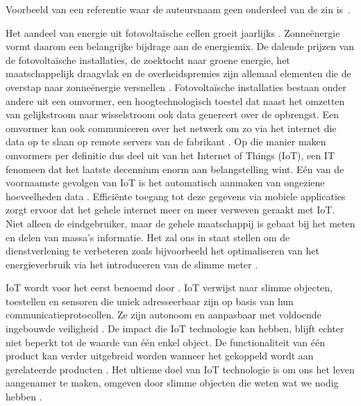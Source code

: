 \documentclass{hogent-article}
\begin{document}
    
    Voorbeeld van een referentie waar de auteursnaam geen onderdeel van de zin is~\autocite{Moore2002}.
    
    Het aandeel van energie uit fotovoltaïsche cellen groeit jaarlijks \autocite{Shurtleff_2018}. Zonneënergie vormt daarom een belangrijke bijdrage aan de energiemix. De dalende prijzen van de fotovoltaïsche installaties, de zoektocht naar groene energie, het maatschappelijk draagvlak en de overheidspremies zijn allemaal elementen die de overstap naar zonneënergie versnellen \autocite{Kouro_2016}. Fotovoltaïsche installaties bestaan onder andere uit een omvormer, een hoogtechnologisch toestel dat naast het omzetten van gelijkstroom naar wisselstroom ook data genereert over de opbrengst. Een omvormer kan ook communiceren over het netwerk om zo via het internet die data op te slaan op remote servers van de fabrikant \autocite{Huawei}. Op die manier maken omvormers per definitie dus deel uit van het Internet of Things (IoT), een IT fenomeen dat het laatste decennium enorm aan belangstelling wint. Eén van de voornaamste gevolgen van IoT is het automatisch aanmaken van ongeziene hoeveelheden data \autocite{Gubbi_2013} \autocite{Kassab_2020}. Efficiënte toegang tot deze gegevens via mobiele applicaties zorgt ervoor dat het gehele internet meer en meer verweven geraakt met IoT. Niet alleen de eindgebruiker, maar de gehele maatschappij is gebaat bij het meten en delen van massa's informatie. Het zal ons in staat stellen om de dienstverlening te verbeteren zoals bijvoorbeeld het optimaliseren van het energieverbruik via het introduceren van de slimme meter \autocite{Gubbi_2013}.
    
    IoT wordt voor het eerst benoemd door \textcite{Ashton_2009}. IoT verwijst naar slimme objecten, toestellen en sensoren die uniek adresseerbaar zijn op basis van hun communicatieprotocollen. Ze zijn autonoom en aanpasbaar met voldoende ingebouwde veiligheid \autocite{Shafique_2020}. De impact die IoT technologie kan hebben, blijft echter niet beperkt tot de waarde van één enkel object. De functionaliteit van één product kan verder uitgebreid worden wanneer het gekoppeld wordt aan gerelateerde producten \autocite{Wortmann_2015}. Het ultieme doel van IoT technologie is om ons het leven aangenamer te maken, omgeven door slimme objecten die weten wat we nodig hebben \autocite{Kassab_2020}.
    
\end{document}
